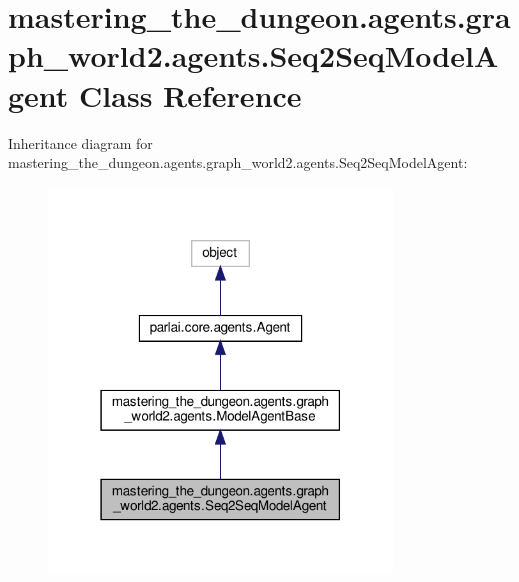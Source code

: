 \hypertarget{classmastering__the__dungeon_1_1agents_1_1graph__world2_1_1agents_1_1Seq2SeqModelAgent}{}\section{mastering\+\_\+the\+\_\+dungeon.\+agents.\+graph\+\_\+world2.\+agents.\+Seq2\+Seq\+Model\+Agent Class Reference}
\label{classmastering__the__dungeon_1_1agents_1_1graph__world2_1_1agents_1_1Seq2SeqModelAgent}


Inheritance diagram for mastering\+\_\+the\+\_\+dungeon.\+agents.\+graph\+\_\+world2.\+agents.\+Seq2\+Seq\+Model\+Agent\+:
\nopagebreak
\begin{figure}[H]
\begin{center}
\leavevmode
\includegraphics[width=259pt]{classmastering__the__dungeon_1_1agents_1_1graph__world2_1_1agents_1_1Seq2SeqModelAgent__inherit__graph}
\end{center}
\end{figure}


